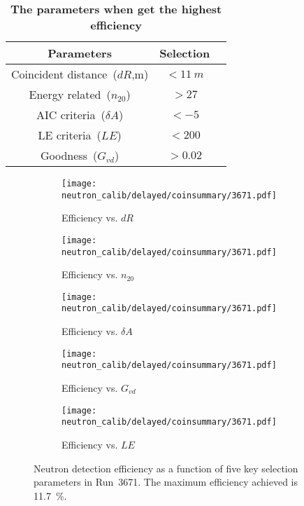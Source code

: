\begin{table}[htbp]
	\caption{\textbf{The parameters when get the highest efficiency}}%
	\label{tab:param-scan-eff}
	\centering%
	\begin{tabular}{ccc}
		\toprule%
		Parameters                   & Selection     \\
		\midrule%
		Coincident distance~($dR$,m) & $<\SI{11}{m}$ \\
		Energy related~($n_{20}$)    & $>27$         \\
		AIC criteria~($\delta A$)    & $<-5$         \\
		LE criteria~($LE$)           & $<200$        \\
		Goodness~($G_{vd}$)          & $>0.02$       \\
		\bottomrule
	\end{tabular}
\end{table}

\begin{figure}[htbp]
	\centering
	\begin{subfigure}{0.5\textwidth}
		\centering
		\texttt{[image: neutron\_calib/delayed/coinsummary/3671.pdf]}
		\caption{Efficiency vs. $dR$}
		\label{fig:effdR}
	\end{subfigure}%
	\begin{subfigure}{0.5\textwidth}
		\centering
		\texttt{[image: neutron\_calib/delayed/coinsummary/3671.pdf]}
		\caption{Efficiency vs. $n_{20}$}
		\label{fig:effn20}
	\end{subfigure}
	\begin{subfigure}{0.5\textwidth}
		\centering
		\texttt{[image: neutron\_calib/delayed/coinsummary/3671.pdf]}
		\caption{Efficiency vs. $\delta A$}
		\label{fig:effdA}
	\end{subfigure}%
	\begin{subfigure}{0.5\textwidth}
		\centering
		\texttt{[image: neutron\_calib/delayed/coinsummary/3671.pdf]}
		\caption{Efficiency vs. $G_{vd}$}
		\label{fig:effGvd}
	\end{subfigure}
	\begin{subfigure}{0.5\textwidth}
		\centering
		\texttt{[image: neutron\_calib/delayed/coinsummary/3671.pdf]}
		\caption{Efficiency vs. $LE$}
		\label{fig:effLE}
	\end{subfigure}
	\caption{Neutron detection efficiency as a function of five key selection parameters in Run~3671. The maximum efficiency achieved is \SI{11.7}{\%}.}
	\label{fig:High-eff}
\end{figure}

